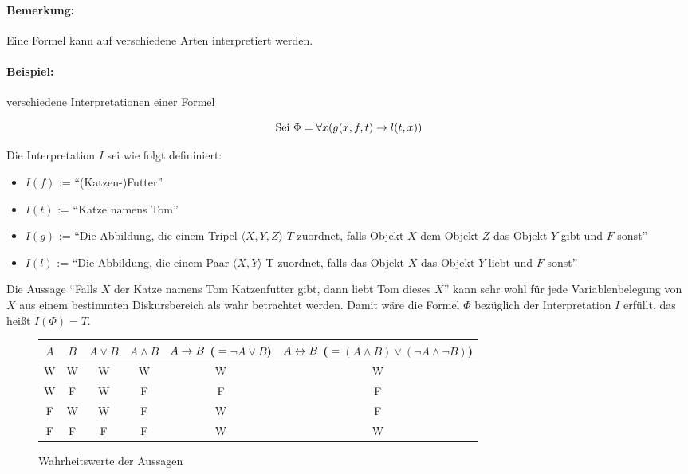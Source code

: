 \documentclass[a4paper,twoside,DIV15,BCOR12mm]{scrbook}
\begin{document}
\paragraph{Bemerkung:} Eine Formel kann auf verschiedene Arten interpretiert werden.

\paragraph{Beispiel:} verschiedene Interpretationen einer Formel

$$\text{Sei }\Phi = \forall x(g(x,f,t) \rightarrow l(t,x))$$

Die Interpretation $I$ sei wie folgt defininiert:

\begin{itemize}
\item $I(f)$ := "`(Katzen-)Futter"'
\item $I(t)$ := "`Katze namens Tom"'
\item $I(g)$ := "`Die Abbildung, die einem Tripel $\langle X,Y,Z\rangle$ $T$ zuordnet, falls Objekt $X$ dem Objekt $Z$ das Objekt $Y$ gibt und $F$ sonst"'
\item $I(l)$ := "`Die Abbildung, die einem Paar $\langle X,Y \rangle$ T zuordnet, falls das Objekt $X$ das Objekt $Y$ liebt und $F$ sonst"'
\end{itemize}

Die Aussage "`Falls $X$ der Katze namens Tom Katzenfutter gibt, dann liebt Tom dieses $X$"' kann sehr wohl für jede Variablenbelegung von $X$ aus einem bestimmten Diskursbereich als wahr betrachtet werden. Damit wäre die Formel $\Phi$ bezüglich der Interpretation $I$ erfüllt, das heißt $I(\Phi) = T$.

\begin{figure}[htb]
	\centering
	\begin{tabular}{|c|c|c|c|c|c|}
		\hline
		$A$	&	$B$	&	$A \vee B$ & $A \wedge B$ & $A \rightarrow B$ ($\equiv\neg A \vee B$) &
		$A \leftrightarrow B$ ($\equiv (A\wedge B) \vee (\neg A \wedge \neg B)$) \\
		\hline
		W	&W	&W	&W	&W	&W	\\
		W	&F	&W	&F	&F	&F	\\
		F	&W	&W	&F	&W	&F	\\
		F	&F	&F	&F	&W	&W	\\
		\hline
	\end{tabular}
	\caption{Wahrheitswerte der Aussagen}
\end{figure}

\end{document}
